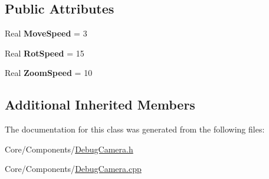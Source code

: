 \subsection*{Public Attributes}
\begin{DoxyCompactItemize}
\item 
\hypertarget{classDCEngine_1_1Components_1_1DebugCamera_ae569e466b9733d7f6fbdd77f40a82a0e}{Real {\bfseries Move\-Speed} = 3}\label{classDCEngine_1_1Components_1_1DebugCamera_ae569e466b9733d7f6fbdd77f40a82a0e}

\item 
\hypertarget{classDCEngine_1_1Components_1_1DebugCamera_a53a1bf819df296c48ad5f078403b9198}{Real {\bfseries Rot\-Speed} = 15}\label{classDCEngine_1_1Components_1_1DebugCamera_a53a1bf819df296c48ad5f078403b9198}

\item 
\hypertarget{classDCEngine_1_1Components_1_1DebugCamera_ac336fdc9b934ef4057d73199f6720442}{Real {\bfseries Zoom\-Speed} = 10}\label{classDCEngine_1_1Components_1_1DebugCamera_ac336fdc9b934ef4057d73199f6720442}

\end{DoxyCompactItemize}
\subsection*{Additional Inherited Members}


The documentation for this class was generated from the following files\-:\begin{DoxyCompactItemize}
\item 
Core/\-Components/\hyperlink{DebugCamera_8h}{Debug\-Camera.\-h}\item 
Core/\-Components/\hyperlink{DebugCamera_8cpp}{Debug\-Camera.\-cpp}\end{DoxyCompactItemize}
